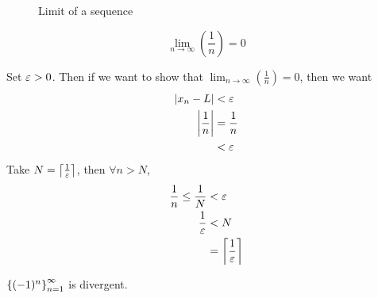\documentclass[12pt]{article}
\theoremstyle{definition}
\renewenvironment{proof}[1][\proofname]{\vspace{-10pt}\begin{replacementproof}}{\end{replacementproof}}
\begin{document}
    \begin{figure}[H]
        \centering
        \caption{Limit of a sequence}
    \end{figure}
    \newpage
    \begin{prop}
        \begin{equation*}
            \lim_{n \rightarrow \infty}\left(\frac{1}{n}\right) = 0
        \end{equation*}
    \end{prop}
    \begin{proof}
        Set $\varepsilon > 0$. Then if we want to show that $\lim_{n \rightarrow \infty}\left(\frac{1}{n}\right) = 0$, then we want
        \begin{align*}
            \left|x_{n} - L\right| &< \varepsilon \\
            \left|\frac{1}{n}\right| &= \frac{1}{n} \\
                              &< \varepsilon
        \end{align*}
        Take $N = \left\lceil\frac{1}{\varepsilon}\right\rceil$, then $\forall n > N$, 
        \begin{align*}
            \frac{1}{n} \leq \frac{1}{N} &< \varepsilon \\
                        \frac{1}{\varepsilon} &< N \\
                                         &= \left\lceil\frac{1}{\varepsilon}\right\rceil
        \end{align*}
    \end{proof}
    \begin{prop}
        $\left\{(-1)^{n}\right\}_{n = 1}^{\infty}$ is divergent. 
    \end{prop}
\end{document}
